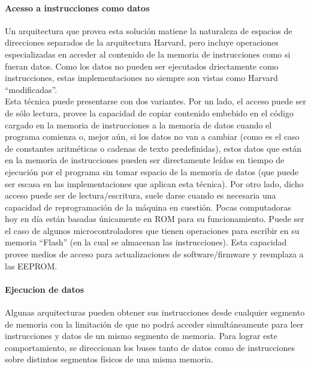 \paragraph{Acesso a instrucciones como datos}
\label{par:theory-modern-memory_access-modified_harvard-instructions_as_data}

Un arquitectura que provea esta solución matiene la naturaleza de espacios de
direcciones separados de la arquitectura Harvard, pero incluye operaciones
especializadas en acceder al contenido de la memoria de instrucciones como si
fueran datos. Como los datos no pueden ser ejecutados driectamente como
instrucciones, estas implementaciones no siempre son vistas como Harvard
``modificadas''.\\
Esta técnica puede presentarse con dos variantes. Por un lado, el acceso puede
ser de sólo lectura, provee la capacidad de copiar contenido embebido en el
código cargado en la memoria de instrucciones a la memoria de datos cuando el
programa comienza o, mejor aún, si los datos no van a cambiar (como es el caso
de constantes aritméticas o cadenas de texto predefinidas), estos datos que
están en la memoria de instrucciones pueden ser directamente leídos en tiempo de
ejecución por el programa sin tomar espacio de la memoria de datos (que puede
ser escasa en las implementaciones que aplican esta técnica). Por otro lado,
dicho acceso puede ser de lectura/escritura, suele darse cuando es necesaria una
capacidad de reprogramación de la máquina en cuestión. Pocas computadoras hoy en
día están basadas únicamente en ROM para su funcionamiento. Puede ser el caso de
algunos microcontroladores que tienen operaciones para escribir en su memoria
``Flash'' (en la cual se almacenan las instrucciones). Esta capacidad provee
medios de acceso para actualizaciones de software/firmware y reemplaza a las
EEPROM.

\paragraph{Ejecucion de datos}
\label{par:theory-modern-memory_access-modified_harvard-data_execution}

Algunas arquitecturas pueden obtener sus instrucciones desde cualquier segmento
de memoria con la limitación de que no podrá acceder simultáneamente para leer
instrucciones y datos de un mismo segmento de memoria. Para lograr este
comportamiento, se direccionan los buses tanto de datos como de instrucciones
sobre distintos segmentos físicos de una misma memoria.


